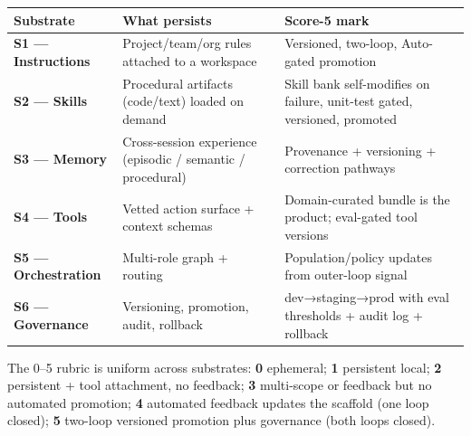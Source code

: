 \documentclass[
]{article}
\newcounter{none} %
\begin{document}
{\def\LTcaptype{none} %
\begin{longtable}[]{@{}
  >{\raggedright\arraybackslash}p{}
  >{\raggedright\arraybackslash}p{}
  >{\raggedright\arraybackslash}p{}@{}}
\toprule\noalign{}
\begin{minipage}[b]{\linewidth}\raggedright
Substrate
\end{minipage} & \begin{minipage}[b]{\linewidth}\raggedright
What persists
\end{minipage} & \begin{minipage}[b]{\linewidth}\raggedright
Score-5 mark
\end{minipage} \\
\midrule\noalign{}
\endhead
\bottomrule\noalign{}
\endlastfoot
\textbf{S1 --- Instructions} & Project/team/org rules attached to a
workspace & Versioned, two-loop, Auto-gated promotion \\
\textbf{S2 --- Skills} & Procedural artifacts (code/text) loaded on
demand & Skill bank self-modifies on failure, unit-test gated,
versioned, promoted \\
\textbf{S3 --- Memory} & Cross-session experience (episodic / semantic /
procedural) & Provenance + versioning + correction pathways \\
\textbf{S4 --- Tools} & Vetted action surface + context schemas &
Domain-curated bundle is the product; eval-gated tool versions \\
\textbf{S5 --- Orchestration} & Multi-role graph + routing &
Population/policy updates from outer-loop signal \\
\textbf{S6 --- Governance} & Versioning, promotion, audit, rollback &
dev→staging→prod with eval thresholds + audit log + rollback \\
\end{longtable}
}

The 0--5 rubric is uniform across substrates: \textbf{0} ephemeral;
\textbf{1} persistent local; \textbf{2} persistent + tool attachment, no
feedback; \textbf{3} multi-scope or feedback but no automated promotion;
\textbf{4} automated feedback updates the scaffold (one loop closed);
\textbf{5} two-loop versioned promotion plus governance (both loops
closed).
\end{document}
